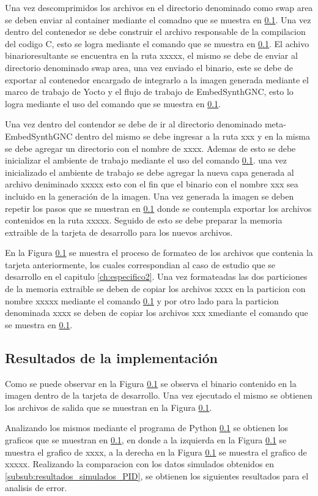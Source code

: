 Una vez descomprimidos los archivos en el directorio denominado como swap area se deben enviar al container mediante el comadno que se muestra en \ref{}. Una vez dentro del contenedor se debe construir el archivo responsable de la compilacion del codigo C, esto se logra mediante el comando que se muestra en \ref{}. El achivo binarioresultante se encuentra en la ruta xxxxx, el mismo se debe de enviar al directorio denominado swap area, una vez enviado el binario, este se debe de exportar al contenedor encargado de integrarlo a la imagen generada mediante el marco de trabajo de Yocto y el flujo de trabajo de EmbedSynthGNC, esto lo logra mediante el uso del comando que se muestra en \ref{}. 


Una vez dentro del contendor se debe de ir al directorio denominado meta-EmbedSynthGNC dentro del mismo se debe ingresar a la ruta xxx y en la misma se debe agregar un directorio con el nombre de xxxx. Ademas de esto se debe inicializar el ambiente de trabajo mediante el uso del comando \ref{}. una vez inicializado el ambiente de trabajo se debe agregar la nueva capa generada al archivo deniminado xxxxx esto con el fin que el binario con el nombre xxx sea incluido en la generación de la imagen. Una vez generada la imagen se deben repetir los pasos que se muestran en \ref{} donde se contempla exportar los archivos contenidos en la ruta xxxxx. Seguido de esto se debe preparar la memoria extraible de la tarjeta de desarrollo para los nuevos archivos. 


En la Figura \ref{} se muestra el proceso de formateo de los archivos que contenia la tarjeta anteriormente, los cuales correspondian al caso de estudio que se desarrollo en el capitulo \ref{ch:especifico2}. Una vez formateadas las dos particiones de la memoria extraible se deben de copiar los archivos xxxx en la particion con nombre xxxxx mediante el comando \ref{} y por otro lado para la particion denominada xxxx se deben de copiar los archivos xxx xmediante el comando que se muestra en \ref{}. 


\subsection{Resultados de la implementación}

Como se puede observar en la Figura \ref{} se observa el binario contenido en la imagen dentro de la tarjeta de desarrollo. Una vez ejecutado el mismo se obtienen los archivos de salida que se muestran en la Figura \ref{}. 


Analizando los mismos mediante el programa de Python \ref{} se obtienen los graficos que se muestran en \ref{}, en donde a la izquierda en la Figura \ref{} se muestra el grafico de xxxx, a la derecha en la Figura \ref{} se muestra el grafico de xxxxx. Realizando la comparacion con los datos simulados obtenidos en \ref{subsub:resultados_simulados_PID}, se obtienen los siguientes resultados para el analisis de error.


